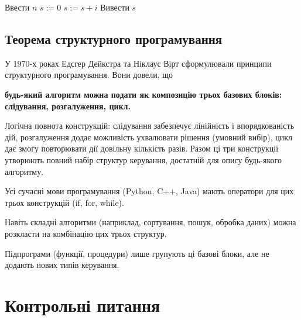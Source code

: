 \begin{tcolorbox}[title=Алгоритм: Сума чисел від 1 до $n$]
	
		\begin{algorithmic}
			\STATE Ввести $n$
			\STATE $s := 0$
			\STATE $s := s + i$
			\ENDFOR
			\STATE Вивести $s$
		\end{algorithmic}

\end{tcolorbox}
	
	\subsection*{	Теорема структурного програмування}
	У 1970‑х роках Едсгер Дейкстра та Ніклаус Вірт сформулювали принципи структурного програмування.	Вони довели, що
	\begin{defn}{}
	
	 \textbf{будь-який алгоритм можна подати як композицію трьох базових блоків: слідування, розгалуження, цикл.} 
\end{defn}

	Логічна повнота конструкцій: слідування забезпечує лінійність і впорядкованість дій, розгалуження додає можливість ухвалювати рішення (умовний вибір), цикл дає змогу повторювати дії довільну кількість разів. 	Разом ці три конструкції утворюють повний набір структур керування, достатній для опису будь-якого алгоритму.
	
	Усі сучасні мови програмування (Python, C++, Java) мають оператори для цих трьох конструкцій (if, for, while).
	
	Навіть складні алгоритми (наприклад, сортування, пошук, обробка даних) можна розкласти на комбінацію цих трьох структур.
	
	Підпрограми (функції, процедури) лише групують ці базові блоки, але не додають нових типів керування.


\section*{Контрольні питання}

